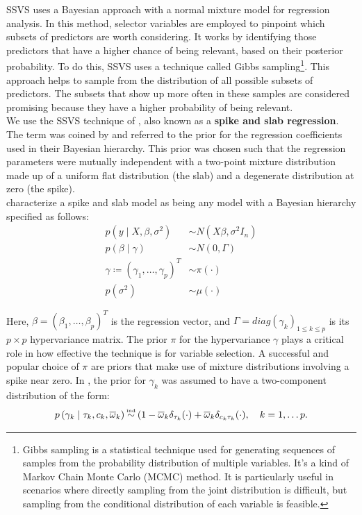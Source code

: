 \documentclass[11pt]{article}
\newcommand\myeq{\stackrel{\mathclap{\normalfont\mbox{\tiny ind}}}{\sim}}
\begin{document}
SSVS uses a Bayesian approach with a normal mixture model for regression analysis. In this method, selector variables are employed to pinpoint which subsets of predictors are worth considering. It works by identifying those predictors that have a higher chance of being relevant, based on their posterior probability. To do this, SSVS uses a technique called Gibbs sampling\footnote{Gibbs sampling is a statistical technique used for generating sequences of samples from the probability distribution of multiple variables. It's a kind of Markov Chain Monte Carlo (MCMC) method. It is particularly useful in scenarios where directly sampling from the joint distribution is difficult, but sampling from the conditional distribution of each variable is feasible.}. This approach helps to sample from the distribution of all possible subsets of predictors. The subsets that show up more often in these samples are considered promising because they have a higher probability of being relevant. \\

We use the SSVS technique of \cite{george_and_mcculloch}, also known as a \textbf{spike and slab regression}. The term was coined by \cite{mitchell_beauchamp} and referred to the prior for the regression coefficients used in their Bayesian hierarchy. This prior was chosen such that the regression parameters were mutually independent with a two-point mixture distribution made up of a uniform flat distribution (the slab) and a degenerate distribution at zero (the spike). \\

\cite{ishwaran2005spike} characterize a spike and slab model as being any model with a Bayesian hierarchy specified as follows:
\begin{align*}
	p(y \mid X, \beta, \sigma^2) &\sim N( X\beta, \sigma^2 I_n)	\\
	p(\beta \mid \gamma) &\sim N (0, \Gamma) \\
	\gamma \coloneqq (\gamma_1, \ldots, \gamma_p)^T &\sim \pi (\cdot) \\
	p(\sigma^2) &\sim \mu( \cdot )
\end{align*}

Here, $\beta = (\beta_1, \ldots, \beta_p)^T$ is the regression vector, and $\Gamma = diag(\gamma_k)_{1 \leq k \leq p}$ is its $p \times p$ hypervariance matrix. The prior $\pi$ for the hypervariance $\gamma$ plays a critical role in how effective the technique is for variable selection. A successful and popular choice of $\pi$ are priors that make use of mixture distributions involving a spike near zero. In \cite{george_and_mcculloch}, the prior for $\gamma_k$ was assumed to have a two-component distribution of the form:
\begin{equation*}
	p \left( \gamma_k \mid \tau_k, c_k, \overline{\omega}_k \right) \myeq (1 - \overline{\omega}_k \delta_{\tau_k} (\cdot) + \overline{\omega}_k \delta_{c_k \tau_k} (\cdot), \quad k = 1, \ldots p.
\end{equation*}
\end{document}
